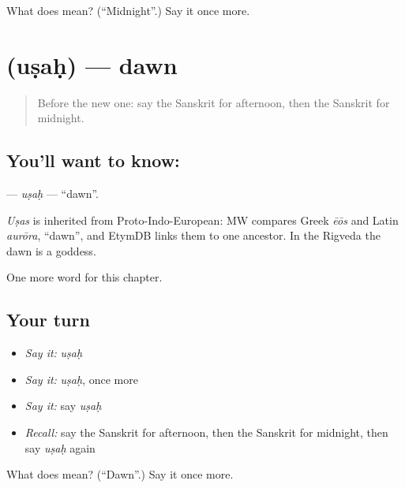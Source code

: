 \begin{tcolorbox}[breakable,colback=teal!4,colframe=teal!35!black,title={Before you move on}]
What does  mean? (\textquotedblleft{}Midnight\textquotedblright{}.) Say it once more.
\end{tcolorbox}
\section[\texorpdfstring{\sk{उषः} (uṣaḥ)}{उषः (uṣaḥ)}]{ (uṣaḥ) — dawn}

\label{lesson:SA-C90-usah}



\begin{quote}
Before the new one: say the Sanskrit for afternoon, then the Sanskrit for midnight.
\end{quote}

\subsection*{You'll want to know: }
\textbf{} — \emph{uṣaḥ} — \textquotedblleft{}dawn\textquotedblright{}.

\begin{cousinweb}
\emph{Uṣas} is inherited from Proto-Indo-European: MW compares Greek \emph{ēōs} and Latin \emph{aurōra}, \textquotedblleft{}dawn\textquotedblright{}, and EtymDB links them to one ancestor. In the Rigveda the dawn is a goddess.
\end{cousinweb}

\begin{grammarlens}[title={What you've built}]
One more word for this chapter.
\end{grammarlens}

\subsection*{Your turn}
\begin{itemize}
\raggedright
  \item \emph{Say it:} \emph{uṣaḥ}
  \item \emph{Say it:} \emph{uṣaḥ}, once more
  \item \emph{Say it:} say \emph{uṣaḥ}
  \item \emph{Recall:} say the Sanskrit for afternoon, then the Sanskrit for midnight, then say \emph{uṣaḥ} again
\end{itemize}

\begin{tcolorbox}[breakable,colback=teal!4,colframe=teal!35!black,title={Before you move on}]
What does  mean? (\textquotedblleft{}Dawn\textquotedblright{}.) Say it once more.
\end{tcolorbox}
